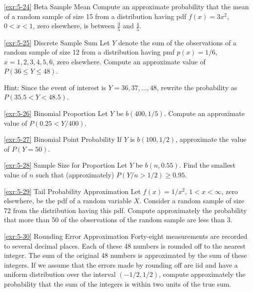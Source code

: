 \begin{exercise}{\ref{exr:5-24} Beta Sample Mean}\label{exr:5-24}
Compute an approximate probability that the mean of a random sample of size 15 from a distribution having pdf $f(x) = 3x^2$, $0 < x < 1$, zero elsewhere, is between $\frac{3}{5}$ and $\frac{4}{5}$.
\end{exercise}

\begin{exercise}{\ref{exr:5-25} Discrete Sample Sum}\label{exr:5-25}
Let $Y$ denote the sum of the observations of a random sample of size 12 from a distribution having pmf $p(x) = 1/6$, $x = 1, 2, 3, 4, 5, 6$, zero elsewhere. Compute an approximate value of $P(36 \leq Y \leq 48)$.

Hint: Since the event of interest is $Y = 36, 37, \ldots, 48$, rewrite the probability as $P(35.5 < Y < 48.5)$.
\end{exercise}

\begin{exercise}{\ref{exr:5-26} Binomial Proportion}\label{exr:5-26}
Let $Y$ be $b(400, 1/5)$. Compute an approximate value of $P(0.25 < Y/400)$.
\end{exercise}

\begin{exercise}{\ref{exr:5-27} Binomial Point Probability}\label{exr:5-27}
If $Y$ is $b(100, 1/2)$, approximate the value of $P(Y = 50)$.
\end{exercise}

\begin{exercise}{\ref{exr:5-28} Sample Size for Proportion}\label{exr:5-28}
Let $Y$ be $b(n, 0.55)$. Find the smallest value of $n$ such that (approximately) $P(Y/n > 1/2) \geq 0.95$.
\end{exercise}

\begin{exercise}{\ref{exr:5-29} Tail Probability Approximation}\label{exr:5-29}
Let $f(x) = 1/x^2$, $1 < x < \infty$, zero elsewhere, be the pdf of a random variable $X$. Consider a random sample of size 72 from the distribution having this pdf. Compute approximately the probability that more than 50 of the observations of the random sample are less than 3.
\end{exercise}

\begin{exercise}{\ref{exr:5-30} Rounding Error Approximation}\label{exr:5-30}
Forty-eight measurements are recorded to several decimal places. Each of these 48 numbers is rounded off to the nearest integer. The sum of the original 48 numbers is approximated by the sum of these integers. If we assume that the errors made by rounding off are iid and have a uniform distribution over the interval $(-1/2, 1/2)$, compute approximately the probability that the sum of the integers is within two units of the true sum.
\end{exercise}

